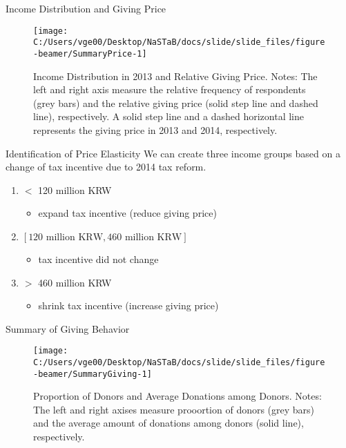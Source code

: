 \documentclass[
  ignorenonframetext,
  aspectratio=169,
]{beamer}
\providecommand{\tightlist}{%
  \setlength{\itemsep}{0pt}\setlength{\parskip}{0pt}}
\begin{document}
\begin{frame}{Income Distribution and Giving Price}
\protect\hypertarget{income-distribution-and-giving-price}{}
\begin{figure}[t]

{\centering \texttt{[image: C:/Users/vge00/Desktop/NaSTaB/docs/slide/slide\_files/figure-beamer/SummaryPrice-1]} 

}

\caption{Income Distribution in 2013 and Relative Giving Price. Notes: The left and right axis measure the relative frequency of respondents (grey bars) and the relative giving price (solid step line and dashed line), respectively. A solid step line and a dashed horizontal line represents the giving price in 2013 and 2014, respectively.}\label{fig:SummaryPrice}
\end{figure}
\end{frame}

\begin{frame}{Identification of Price Elasticity}
\protect\hypertarget{identification-of-price-elasticity}{}
We can create three income groups based on
a change of tax incentive due to 2014 tax reform.

\begin{enumerate}
\tightlist
\item
  \(<\) 120 million KRW

  \begin{itemize}
  \tightlist
  \item
    expand tax incentive (reduce giving price)
  \end{itemize}
\item
  \([\text{120 million KRW}, \text{460 million KRW}]\)

  \begin{itemize}
  \tightlist
  \item
    tax incentive did not change
  \end{itemize}
\item
  \(>\) 460 million KRW

  \begin{itemize}
  \tightlist
  \item
    shrink tax incentive (increase giving price)
  \end{itemize}
\end{enumerate}
\end{frame}

\begin{frame}{Summary of Giving Behavior}
\protect\hypertarget{summary-of-giving-behavior}{}
\begin{figure}[t]

{\centering \texttt{[image: C:/Users/vge00/Desktop/NaSTaB/docs/slide/slide\_files/figure-beamer/SummaryGiving-1]} 

}

\caption{Proportion of Donors and Average Donations among Donors. Notes: The left and right axises measure prooortion of donors (grey bars) and the average amount of donations among donors (solid line), respectively.}\label{fig:SummaryGiving}
\end{figure}
\end{frame}
\end{document}
